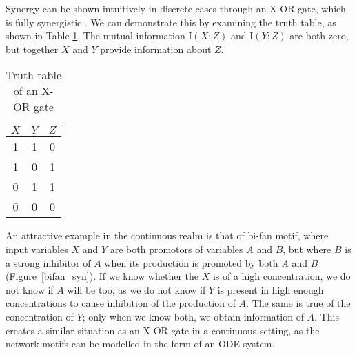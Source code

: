 \documentclass[../main.tex]{subfiles}
\begin{document}
Synergy can be shown intuitively in discrete cases through an X-OR gate, which is fully synergistic \cite{quax2017quantifying}.
We can demonstrate this by examining the truth table, as shown in Table \ref{XOR}.
The mutual information $\mathrm{I}(X;Z)$ and $\mathrm{I}(Y;Z)$ are both zero, but together $X$ and $Y$ provide information about $Z$.

\begin{table}[ht]
\begin{center}
\begin{tabular}{|c|c||c|}
\hline
$X$ & $Y$ & $Z$ \\
\hline
\hline
1 & 1 & 0 \\
1 & 0 & 1 \\
0 & 1 & 1 \\
0 & 0 & 0 \\
\hline
\end{tabular}
\end{center}
\caption{Truth table of an X-OR gate}
\label{XOR}
\end{table}

An attractive example in the continuous realm is that of bi-fan motif, where input variables $X$ and $Y$ are both promotors of variables $A$ and $B$, but where $B$ is a strong inhibitor of $A$ when its production is promoted by both $A$ and $B$ (Figure~\ref{bifan_syn}).
If we know whether the $X$ is of a high concentration, we do not know if $A$ will be too, as we do not know if $Y$ is present in high enough concentrations to cause inhibition of the production of $A$.
The same is true of the concentration of $Y$; only when we know both, we obtain information of $A$.
This creates a similar situation as an X-OR gate in a continuous setting, as the network motifs can be modelled in the form of an ODE system.
\end{document}
